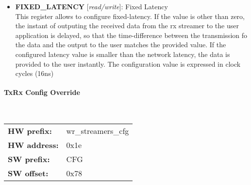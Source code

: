 \vspace{12pt}
\noindent
{}

\begin{itemize}
\item \begin{small}
{\bf 
FIXED\_LATENCY
} [\emph{read/write}]: Fixed Latency
\\
This register allows to configure fixed-latency. If the value is other than zero, the instant of outputing the received data from the rx streamer to the user application is delayed, so that the time-difference between the transmission fo the data and the output to the user matches the provided value. If the configured latency value is smaller than the network latency, the data is provided to the user instantly. The configuration value is expressed in clock cycles (16ns) 
\end{small}
\end{itemize}
\paragraph*{TxRx Config Override}\mbox{}\\\vskip 6pt
\begin{tabular}{l l }
{\bf HW prefix:}  & wr\_streamers\_cfg\\
{\bf HW address:}  & 0x1e\\
{\bf SW prefix:}  & CFG\\
{\bf SW offset:}  & 0x78\\
\end{tabular}


